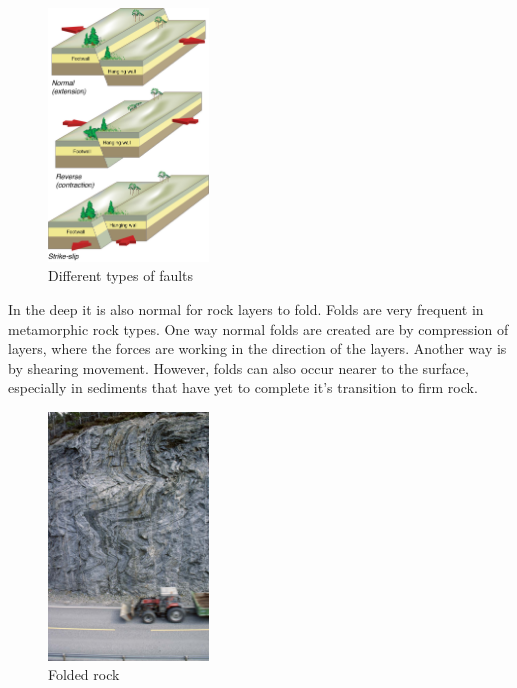 \documentclass[a4paper,12pt]{report}
\begin{document}
\begin{figure}

  \begin{center}
    \includegraphics[width=0.38\textwidth]{thesis/geo/english/faults.jpg}
  \end{center}
 
  \caption{Different types of faults}
  \vspace{15pt}
  \label{fig:faults}
  
\end{figure}

In the deep it is also normal for rock layers to fold. Folds are very frequent in metamorphic rock types. One way normal folds are created are by compression of layers, where the forces are working in the direction of the layers. Another way is by shearing movement. However, folds can also occur nearer to the surface, especially in sediments that have yet to complete it's transition to firm rock.

\begin{figure}
  \begin{center}
    \includegraphics[width=0.38\textwidth]{thesis/geo/fold.png}
  \end{center}
  \caption{Folded rock}
  \label{fig:fold}
  
\end{figure}
\end{document}
